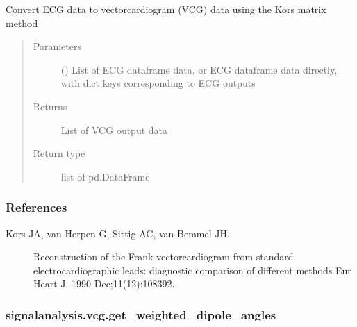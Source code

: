 \documentclass[letterpaper,10pt,english]{sphinxmanual}
\begin{document}
\begin{fulllineitems}
\label{\detokenize{_autosummary/signalanalysis.vcg.get_vcg_from_ecg:signalanalysis.vcg.get_vcg_from_ecg}}
\sphinxAtStartPar
Convert ECG data to vectorcardiogram (VCG) data using the Kors matrix method
\begin{quote}\begin{description}
\item[{Parameters}] \leavevmode
\sphinxAtStartPar
{} () \textendash{} List of ECG dataframe data, or ECG dataframe data directly, with dict keys corresponding to ECG outputs

\item[{Returns}] \leavevmode
\sphinxAtStartPar
{} \textendash{} List of VCG output data

\item[{Return type}] \leavevmode
\sphinxAtStartPar
list of pd.DataFrame

\end{description}\end{quote}
\subsubsection*{References}
\begin{description}
\item[{Kors JA, van Herpen G, Sittig AC, van Bemmel JH.}] \leavevmode
\sphinxAtStartPar
Reconstruction of the Frank vectorcardiogram from standard electrocardiographic leads: diagnostic comparison
of different methods
Eur Heart J. 1990 Dec;11(12):1083\sphinxhyphen{}92.

\end{description}

\end{fulllineitems}



\subsubsection{signalanalysis.vcg.get\_weighted\_dipole\_angles}
\label{\detokenize{_autosummary/signalanalysis.vcg.get_weighted_dipole_angles:signalanalysis-vcg-get-weighted-dipole-angles}}\label{\detokenize{_autosummary/signalanalysis.vcg.get_weighted_dipole_angles::doc}}
\end{document}
